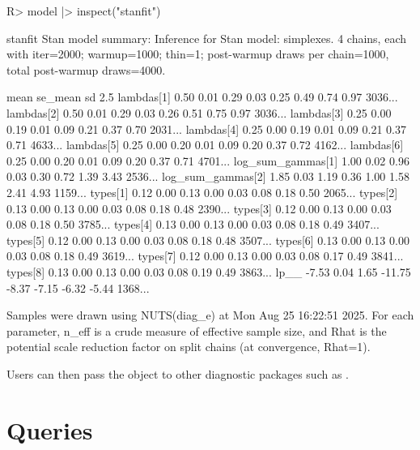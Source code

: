 \documentclass[
  11pt,
  article]{jss}
\renewcommand{\texttt}[1]{\code{#1}}
\begin{document}
\begin{CodeChunk}
\begin{CodeInput}
R> model |> inspect("stanfit")
\end{CodeInput}

\begin{CodeOutput}

stanfit
Stan model summary:
Inference for Stan model: simplexes.
4 chains, each with iter=2000; warmup=1000; thin=1; 
post-warmup draws per chain=1000, total post-warmup draws=4000.

                   mean se_mean   sd   2.5%
lambdas[1]         0.50    0.01 0.29   0.03  0.25  0.49  0.74  0.97  3036...
lambdas[2]         0.50    0.01 0.29   0.03  0.26  0.51  0.75  0.97  3036...
lambdas[3]         0.25    0.00 0.19   0.01  0.09  0.21  0.37  0.70  2031...
lambdas[4]         0.25    0.00 0.19   0.01  0.09  0.21  0.37  0.71  4633...
lambdas[5]         0.25    0.00 0.20   0.01  0.09  0.20  0.37  0.72  4162...
lambdas[6]         0.25    0.00 0.20   0.01  0.09  0.20  0.37  0.71  4701...
log_sum_gammas[1]  1.00    0.02 0.96   0.03  0.30  0.72  1.39  3.43  2536...
log_sum_gammas[2]  1.85    0.03 1.19   0.36  1.00  1.58  2.41  4.93  1159...
types[1]           0.12    0.00 0.13   0.00  0.03  0.08  0.18  0.50  2065...
types[2]           0.13    0.00 0.13   0.00  0.03  0.08  0.18  0.48  2390...
types[3]           0.12    0.00 0.13   0.00  0.03  0.08  0.18  0.50  3785...
types[4]           0.13    0.00 0.13   0.00  0.03  0.08  0.18  0.49  3407...
types[5]           0.12    0.00 0.13   0.00  0.03  0.08  0.18  0.48  3507...
types[6]           0.13    0.00 0.13   0.00  0.03  0.08  0.18  0.49  3619...
types[7]           0.12    0.00 0.13   0.00  0.03  0.08  0.17  0.49  3841...
types[8]           0.13    0.00 0.13   0.00  0.03  0.08  0.19  0.49  3863...
lp__              -7.53    0.04 1.65 -11.75 -8.37 -7.15 -6.32 -5.44  1368...

Samples were drawn using NUTS(diag_e) at Mon Aug 25 16:22:51 2025.
For each parameter, n_eff is a crude measure of effective sample size,
and Rhat is the potential scale reduction factor on split chains (at 
convergence, Rhat=1).
\end{CodeOutput}
\end{CodeChunk}

Users can then pass the \texttt{stanfit} object to other diagnostic
packages such as .

\section{Queries}\label{sec-query}
\end{document}
